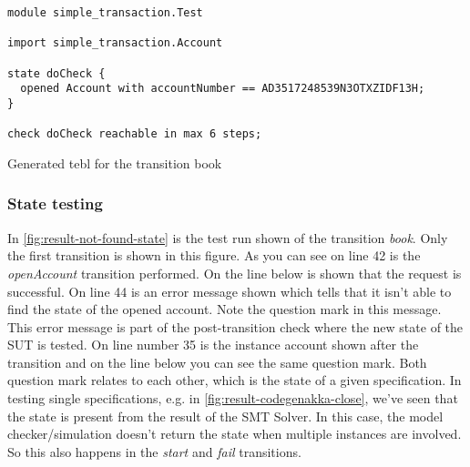 \begin{sourcecode}[h!]
\begin{lstlisting}[]
module simple_transaction.Test

import simple_transaction.Account

state doCheck {
  opened Account with accountNumber == AD3517248539N3OTXZIDF13H;
}

check doCheck reachable in max 6 steps;
\end{lstlisting}
\caption{Generated tebl for the transition book}
\label{fig:tebl-gen-validated-transaction}
\end{sourcecode}

\subsubsection{State testing}

In \autoref{fig:result-not-found-state} is the test run shown of the transition \textit{book}. Only the first transition is shown in this figure. As you can see on line 42 is the \textit{openAccount} transition performed. On the line below is shown that the request is successful. On line 44 is an error message shown which tells that it isn't able to find the state of the opened account. Note the question mark in this message. This error message is part of the post-transition check where the new state of the SUT is tested. On line number 35 is the instance account shown after the transition and on the line below you can see the same question mark. Both question mark relates to each other, which is the state of a given specification. In testing single specifications, e.g. in \autoref{fig:result-codegenakka-close}, we've seen that the state is present from the result of the SMT Solver. In this case, the model checker/simulation doesn't return the state when multiple instances are involved. So this also happens in the \textit{start} and \textit{fail} transitions.

